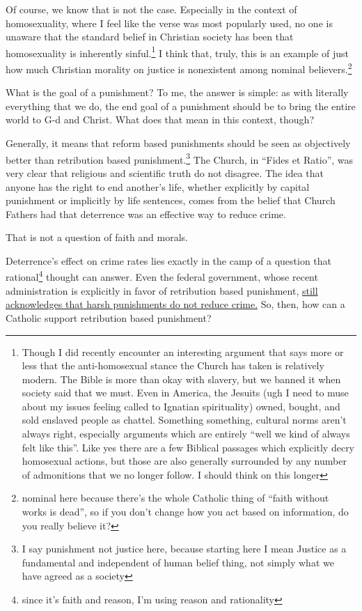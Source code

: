 \documentclass[12pt]{article}[titlepage]
\newcommand{\say}[1]{``#1''}
\renewcommand{\,}{\textsuperscript{,}}
\begin{document}
Of course, we know that is not the case.  
Especially in the context of homosexuality, where I feel like the verse was most popularly used, no one is unaware that the standard belief in Christian society has been that homosexuality is inherently sinful.\footnote{Though I did recently encounter an interesting argument that says more or less that the anti-homosexual stance the Church has taken is relatively modern. The Bible is more than okay with slavery, but we banned it when society said that we must. Even in America, the Jesuits (ugh I need to muse about my issues feeling called to Ignatian spirituality) owned, bought, and sold enslaved people as chattel. Something something, cultural norms aren't always right, especially arguments which are entirely \say{well we kind of always felt like this}. Like yes there are a few Biblical passages which explicitly decry homosexual actions, but those are also generally surrounded by any number of admonitions that we no longer follow. I should think on this longer}  
I think that, truly, this is an example of just how much Christian morality on justice is nonexistent among nominal believers.\footnote{nominal here because there's the whole Catholic thing of \say{faith without works is dead}, so if you don't change how you act based on information, do you really believe it?}

What is the goal of a punishment?  
To me, the answer is simple: as with literally everything that we do, the end goal of a punishment should be to bring the entire world to G-d and Christ.  
What does that mean in this context, though?

Generally, it means that reform based punishments should be seen as objectively better than retribution based punishment.\footnote{I say punishment not justice here, because starting here I mean Justice as a fundamental and independent of human belief thing, not simply what we have agreed as a society}  
The Church, in \say{Fides et Ratio}, was very clear that religious and scientific truth do not disagree.  
The idea that anyone has the right to end another's life, whether explicitly by capital punishment or implicitly by life sentences, comes from the belief that Church Fathers had that deterrence was an effective way to reduce crime.

That is not a question of faith and morals.

Deterrence's effect on crime rates lies exactly in the camp of a question that rational\footnote{since it's faith and reason, I'm using reason and rationality} thought can answer.  
Even the federal government, whose recent administration is explicitly in favor of retribution based punishment, \href{https://nij.ojp.gov/topics/articles/five-things-about-deterrence}{still acknowledges that harsh punishments do not reduce crime.}  
So, then, how can a Catholic support retribution based punishment?
\end{document}
